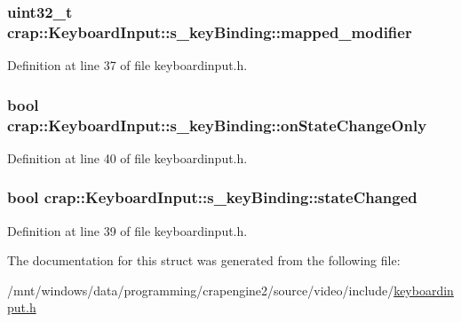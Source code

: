 \subsubsection[{mapped\+\_\+modifier}]{\setlength{\rightskip}{0pt plus 5cm}uint32\+\_\+t crap\+::\+Keyboard\+Input\+::s\+\_\+key\+Binding\+::mapped\+\_\+modifier}\label{structcrap_1_1_keyboard_input_1_1s__key_binding_aa0b547245a3a8a5ac28e5fb7b9321725}


Definition at line 37 of file keyboardinput.\+h.

\hypertarget{structcrap_1_1_keyboard_input_1_1s__key_binding_a4881e319b63069077197ed28b2b2ce23}{}
\subsubsection[{on\+State\+Change\+Only}]{\setlength{\rightskip}{0pt plus 5cm}bool crap\+::\+Keyboard\+Input\+::s\+\_\+key\+Binding\+::on\+State\+Change\+Only}\label{structcrap_1_1_keyboard_input_1_1s__key_binding_a4881e319b63069077197ed28b2b2ce23}


Definition at line 40 of file keyboardinput.\+h.

\hypertarget{structcrap_1_1_keyboard_input_1_1s__key_binding_ab4b86f691dfdf3489100a88fc4bd4128}{}
\subsubsection[{state\+Changed}]{\setlength{\rightskip}{0pt plus 5cm}bool crap\+::\+Keyboard\+Input\+::s\+\_\+key\+Binding\+::state\+Changed}\label{structcrap_1_1_keyboard_input_1_1s__key_binding_ab4b86f691dfdf3489100a88fc4bd4128}


Definition at line 39 of file keyboardinput.\+h.



The documentation for this struct was generated from the following file\+:\begin{DoxyCompactItemize}
\item 
/mnt/windows/data/programming/crapengine2/source/video/include/\hyperlink{keyboardinput_8h}{keyboardinput.\+h}\end{DoxyCompactItemize}
